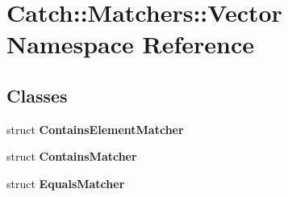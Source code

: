 \section{Catch\+:\+:Matchers\+:\+:Vector Namespace Reference}
\label{namespace_catch_1_1_matchers_1_1_vector}
\subsection*{Classes}
\begin{DoxyCompactItemize}
\item 
struct \textbf{ Contains\+Element\+Matcher}
\item 
struct \textbf{ Contains\+Matcher}
\item 
struct \textbf{ Equals\+Matcher}
\end{DoxyCompactItemize}
